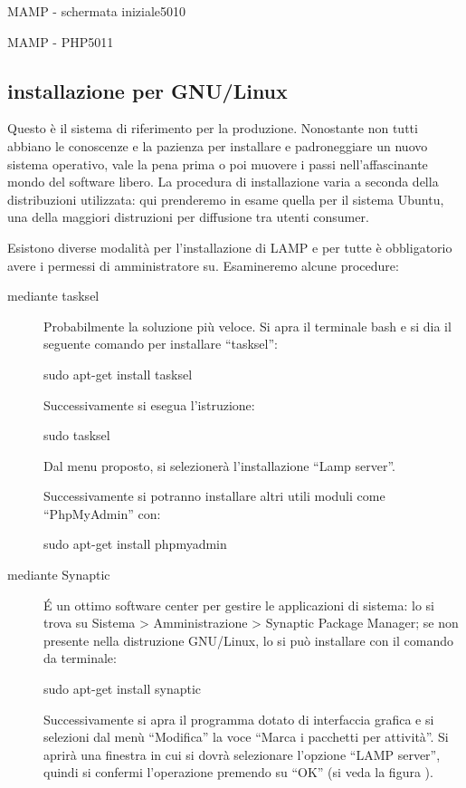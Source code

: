 \begin{img}{MAMP - schermata iniziale}{5}{010}
\end{img}

\begin{img}{MAMP - PHP}{5}{011}
\end{img}

\subsection{installazione per GNU/Linux}
Questo è il sistema di riferimento per la produzione. Nonostante non tutti abbiano le conoscenze e la pazienza per installare e padroneggiare un nuovo sistema operativo, vale la pena prima o poi muovere i passi nell'affascinante mondo del software libero. La procedura di installazione varia a seconda della distribuzioni utilizzata: qui prenderemo in esame quella per il sistema Ubuntu, una della maggiori distruzioni per diffusione tra utenti consumer.

Esistono diverse modalità per l'installazione di \ac{LAMP} e per tutte è obbligatorio avere i permessi di amministratore \ac{su}. Esamineremo alcune procedure:

\begin{description}
\item[mediante tasksel] Probabilmente la soluzione più veloce. Si apra il terminale bash e si dia il seguente comando per installare ``tasksel'':

\begin{code}
sudo apt-get install tasksel
\end{code}

Successivamente si esegua l'istruzione:

\begin{code}
sudo tasksel
\end{code}

Dal menu proposto, si selezionerà l'installazione ``Lamp server''. 

Successivamente si potranno installare altri utili moduli come ``PhpMyAdmin'' con:

\begin{code}
sudo apt-get install phpmyadmin
\end{code}

\item[mediante Synaptic] \'E un ottimo software center per gestire le applicazioni di sistema: lo si trova su Sistema > Amministrazione > Synaptic Package Manager; se non presente nella distruzione GNU/Linux, lo si può installare con il comando da terminale:

\begin{code}
sudo apt-get install synaptic
\end{code}

Successivamente si apra il programma dotato di interfaccia grafica e si selezioni dal menù ``Modifica'' la voce ``Marca i pacchetti per attività''. Si aprirà una finestra in cui si dovrà selezionare l'opzione ``LAMP server'', quindi si confermi l'operazione premendo su ``OK'' (si veda la figura ).
\end{description}

